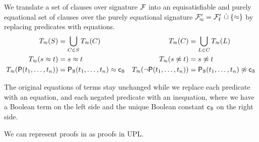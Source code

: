     \begin{definition}
        We translate a set of clauses over signature \( \mathcal{F} \)
        into an equisatisfiable and purely equational set of clauses
        over the purely equational signature
        \( {\mathcal{F}'_{\!\approx}} = {\mathcal{F}'_{\mathsf{f}}}
        \, \mathbin{\dot\cup}  \{ \approx \} \)
        by replacing predicates with equations.
        \begin{align*}
            T_\approx(S) &= \bigcup_{C\in S} T_\approx(C) &
            T_\approx(C) &= \bigcup_{L\in C} T_\approx(L) \\
            T_\approx(s\approx t) &= s\approx t &
            T_\approx(s\not\approx t) &= s\not\approx t \\
            T_\approx(\mathsf{P}(t_1,\ldots,t_n)) &= {\mathsf{P}}_{\mathbb{B}}(t_1,\ldots,t_n)\approx{\mathsf{c}}_{\mathbb{B}} &
            T_\approx(\lnot\mathsf{P}(t_1,\ldots,t_n)) &= {\mathsf{P}}_{\mathbb{B}}(t_1,\ldots,t_n)\not\approx{\mathsf{c}}_{\mathbb{B}}
        \end{align*}
    \end{definition}

    The original equations of terms stay unchanged
    while we replace each predicate with an equation,
    and each negated predicate with an inequation,
    where we have a Boolean term on the left side
    and the unique Boolean constant \( {\mathsf{c}}_{\mathbb{B}} \) on the right side.



    \begin{corollary}
        We can represent proofs in \InstGenEQ{}
        as proofs in {UPL}.
    \end{corollary}

